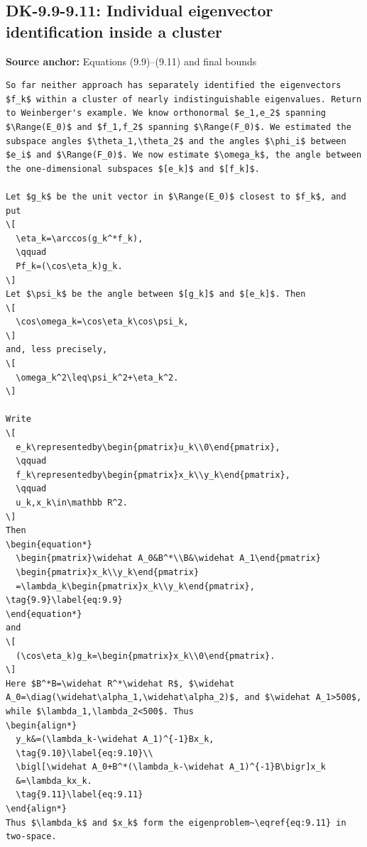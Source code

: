 \subsection*{DK-9.9-9.11: Individual eigenvector identification inside a cluster}
\noindent\textbf{Source anchor:} Equations (9.9)–(9.11) and final bounds\\
\begin{verbatim}
So far neither approach has separately identified the eigenvectors $f_k$ within a cluster of nearly indistinguishable eigenvalues. Return to Weinberger's example. We know orthonormal $e_1,e_2$ spanning $\Range(E_0)$ and $f_1,f_2$ spanning $\Range(F_0)$. We estimated the subspace angles $\theta_1,\theta_2$ and the angles $\phi_i$ between $e_i$ and $\Range(F_0)$. We now estimate $\omega_k$, the angle between the one-dimensional subspaces $[e_k]$ and $[f_k]$.

Let $g_k$ be the unit vector in $\Range(E_0)$ closest to $f_k$, and put
\[
  \eta_k=\arccos(g_k^*f_k),
  \qquad
  Pf_k=(\cos\eta_k)g_k.
\]
Let $\psi_k$ be the angle between $[g_k]$ and $[e_k]$. Then
\[
  \cos\omega_k=\cos\eta_k\cos\psi_k,
\]
and, less precisely,
\[
  \omega_k^2\leq\psi_k^2+\eta_k^2.
\]

Write
\[
  e_k\representedby\begin{pmatrix}u_k\\0\end{pmatrix},
  \qquad
  f_k\representedby\begin{pmatrix}x_k\\y_k\end{pmatrix},
  \qquad
  u_k,x_k\in\mathbb R^2.
\]
Then
\begin{equation*}
  \begin{pmatrix}\widehat A_0&B^*\\B&\widehat A_1\end{pmatrix}
  \begin{pmatrix}x_k\\y_k\end{pmatrix}
  =\lambda_k\begin{pmatrix}x_k\\y_k\end{pmatrix},
\tag{9.9}\label{eq:9.9}
\end{equation*}
and
\[
  (\cos\eta_k)g_k=\begin{pmatrix}x_k\\0\end{pmatrix}.
\]
Here $B^*B=\widehat R^*\widehat R$, $\widehat A_0=\diag(\widehat\alpha_1,\widehat\alpha_2)$, and $\widehat A_1>500$, while $\lambda_1,\lambda_2<500$. Thus
\begin{align*}
  y_k&=(\lambda_k-\widehat A_1)^{-1}Bx_k,
  \tag{9.10}\label{eq:9.10}\\
  \bigl[\widehat A_0+B^*(\lambda_k-\widehat A_1)^{-1}B\bigr]x_k
  &=\lambda_kx_k.
  \tag{9.11}\label{eq:9.11}
\end{align*}
Thus $\lambda_k$ and $x_k$ form the eigenproblem~\eqref{eq:9.11} in two-space.


\end{verbatim}
